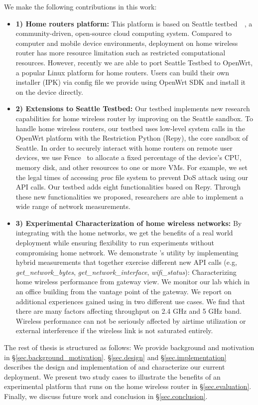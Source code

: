 We make the following contributions in this work:
\begin{itemize}
\item\textbf{1) Home routers platform:} This platform is based on Seattle testbed~\cite{zhuang2013experience}~\cite{cappos2009seattle}, a community-driven, open-source cloud computing system. Compared to computer and mobile device environments, deployment on home wireless router has more resource limitation such as restricted computational resources. However, recently we are able to port Seattle Testbed to OpenWrt, a popular Linux platform for home routers\cite{openwrt}. Users can build their own \sysname installer (IPK) via config file we provide using OpenWrt SDK and install it on the device directly. 
\item\textbf{2) Extensions to Seattle Testbed:}  Our testbed implements new research capabilities for home wireless router by improving on the Seattle sandbox. To handle home wireless routers, our testbed uses low-level system calls in the OpenWrt platform with the Restriction Python (Repy)\cite{cappos2010retaining}, the core sandbox of Seattle. In order to securely interact with home routers on remote user devices, we use Fence~\cite{li2015fence} to allocate a fixed percentage of the device's CPU, memory disk, and other resources to one or more VMs. For example, we set the legal times of accessing \textit{proc} file system to prevent DoS attack using our API calls. Our testbed adds eight functionalities based on Repy. Through these new functionalities we proposed, researchers are able to implement a wide range of network measurements.
\item\textbf{3) Experimental Characterization of home wireless networks:} By integrating \sysname with the home networks, we get the benefits of a real world deployment while ensuring flexibility to run experiments without compromising home network. We demonstrate \sysname's utility by implementing hybrid measurements that together exercise different new API calls (e.g, \textit{get\_network\_bytes}, \textit{get\_network\_interface}, \textit{wifi\_status}): Characterizing home wireless performance from gateway view. We monitor our lab which in an office building from the vantage point of the gateway. We report on additional experiences gained using \sysname in two different use cases. We find that there are many factors affecting throughput on 2.4 GHz and 5 GHz band. Wireless performance can not be seriously affected by airtime utilization or external interference if the wireless link is not saturated entirely.
\end{itemize}

The rest of thesis is structured as follows: We provide background and motivation in \S{\ref{sec.background_motivation}}. \S{\ref{sec.design}} and \S{\ref{sec.implementation}} describes the design and implementation of \sysname and characterize our current deployment. We present two study cases to illustrate the benefits of an experimental platform that runs on the home wireless router in \S{\ref{sec.evaluation}}. Finally, we discuss future work and conclusion in \S{\ref{sec.conclusion}}. 